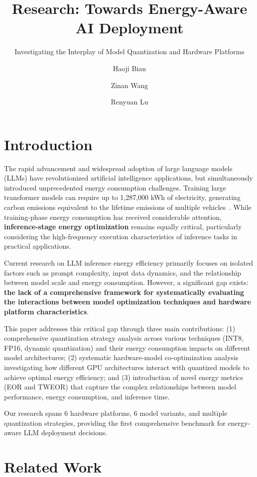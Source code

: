 \documentclass[sigconf,review]{acmart}
\title{Research: Towards Energy-Aware AI Deployment}
\subtitle{Investigating the Interplay of Model Quantization and Hardware Platforms}
\author{Haoji Bian}
\author{Zinan Wang}
\author{Renyuan Lu}
\affiliation{%
  \institution{Northwestern University}
  \city{Evanston}
  \state{Illinois}
  \country{USA}
}
\begin{document}
\maketitle

\section{Introduction}

The rapid advancement and widespread adoption of large language models (LLMs) have revolutionized artificial intelligence applications, but simultaneously introduced unprecedented energy consumption challenges. Training large transformer models can require up to 1,287,000 kWh of electricity, generating carbon emissions equivalent to the lifetime emissions of multiple vehicles~\cite{strubell2019energy}. While training-phase energy consumption has received considerable attention, \textbf{inference-stage energy optimization} remains equally critical, particularly considering the high-frequency execution characteristics of inference tasks in practical applications.

Current research on LLM inference energy efficiency primarily focuses on isolated factors such as prompt complexity, input data dynamics, and the relationship between model scale and energy consumption. However, a significant gap exists: \textbf{the lack of a comprehensive framework for systematically evaluating the interactions between model optimization techniques and hardware platform characteristics}.

This paper addresses this critical gap through three main contributions: (1) comprehensive quantization strategy analysis across various techniques (INT8, FP16, dynamic quantization) and their energy consumption impacts on different model architectures; (2) systematic hardware-model co-optimization analysis investigating how different GPU architectures interact with quantized models to achieve optimal energy efficiency; and (3) introduction of novel energy metrics (EOR and TWEOR) that capture the complex relationships between model performance, energy consumption, and inference time.

Our research spans 6 hardware platforms, 6 model variants, and multiple quantization strategies, providing the first comprehensive benchmark for energy-aware LLM deployment decisions.

\section{Related Work}
\end{document}
